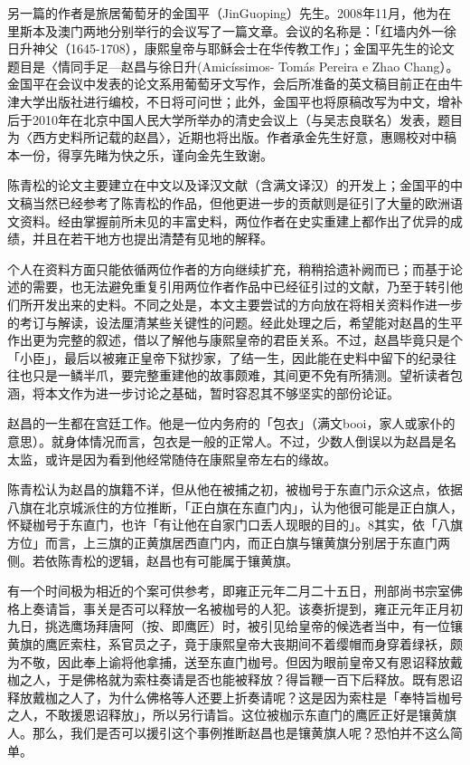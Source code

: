 另一篇的作者是旅居葡萄牙的金国平（JinGuoping）先生。2008年11月，他为在里斯本及澳门两地分别举行的会议写了一篇文章。会议的名称是：「红墙内外一徐日升神父（1645-1708），康熙皇帝与耶稣会士在华传教工作」；金国平先生的论文题目是〈情同手足—赵昌与徐日升(Amicíssimos- Tomás Pereira e Zhao Chang）。金国平在会议中发表的论文系用葡萄牙文写作，会后所准备的英文稿目前正在由牛津大学出版社进行编校，不日将可问世；此外，金国平也将原稿改写为中文，增补后于2010年在北京中国人民大学所举办的清史会议上（与吴志良联名）发表，题目为〈西方史料所记载的赵昌〉，近期也将出版。作者承金先生好意，惠赐校对中稿本一份，得享先睹为快之乐，谨向金先生致谢。

陈青松的论文主要建立在中文以及译汉文献（含满文译汉）的开发上；金国平的中文稿当然已经参考了陈青松的作品，但他更进一步的贡献则是征引了大量的欧洲语文资料。经由掌握前所未见的丰富史料，两位作者在史实重建上都作出了优异的成绩，并且在若干地方也提出清楚有见地的解释。

个人在资料方面只能依循两位作者的方向继续扩充，稍稍拾遗补阙而已；而基于论述的需要，也无法避免重复引用两位作者作品中已经征引过的文献，乃至于转引他们所开发出来的史料。不同之处是，本文主要尝试的方向放在将相关资料作进一步的考订与解读，设法厘清某些关键性的问题。经此处理之后，希望能对赵昌的生平作出更为完整的叙述，借以了解他与康熙皇帝的君臣关系。不过，赵昌毕竟只是个「小臣」，最后以被雍正皇帝下狱抄家，了结一生，因此能在史料中留下的纪录往往也只是一鳞半爪，要完整重建他的故事颇难，其间更不免有所猜测。望祈读者包涵，将本文作为进一步讨论之基础，暂时容忍其不够坚实的部份论证。

\vfill
\begin{BookNotes}
\end{BookNotes}


赵昌的一生都在宫廷工作。他是一位内务府的「包衣」（满文booi，家人或家仆的意思）。就身体情况而言，包衣是一般的正常人。不过，少数人倒误以为赵昌是名太监，或许是因为看到他经常随侍在康熙皇帝左右的缘故。

陈青松认为赵昌的旗籍不详，但从他在被捕之初，被枷号于东直门示众这点，依据八旗在北京城派住的方位推断，「正白旗在东直门内」，认为他很可能是正白旗人，怀疑枷号于东直门，也许「有让他在自家门口丢人现眼的目的」。8其实，依「八旗方位」而言，上三旗的正黄旗居西直门内，而正白旗与镶黄旗分别居于东直门两侧。若依陈青松的逻辑，赵昌也有可能属于镶黄旗。

有一个时间极为相近的个案可供参考，即雍正元年二月二十五日，刑部尚书宗室佛格上奏请旨，事关是否可以释放一名被枷号的人犯。该奏折提到，雍正元年正月初九日，挑选鹰场拜唐阿（按、即鹰匠）时，被引见给皇帝的候选者当中，有一位镶黄旗的鹰匠索柱，系官员之子，竟于康熙皇帝大丧期间不着缨帽而身穿着绿袄，颇为不敬，因此奉上谕将他拿捕，送至东直门枷号。但因为眼前皇帝又有恩诏释放戴枷之人，于是佛格就为索柱奏请是否也能被释放？得旨鞭一百下后释放。既有恩诏释放戴枷之人了，为什么佛格等人还要上折奏请呢？这是因为索柱是「奉特旨枷号之人，不敢援恩诏释放」，所以另行请旨。这位被枷示东直门的鹰匠正好是镶黄旗人。那么，我们是否可以援引这个事例推断赵昌也是镶黄旗人呢？恐怕并不这么简单。

